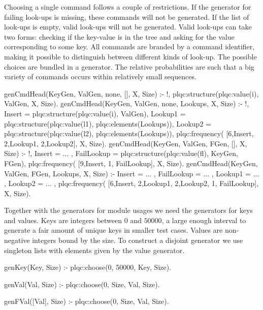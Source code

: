 Choosing a single command follows a couple of restrictions.
%
If the generator for failing look-ups is missing, these commands will
not be generated.
%
If the list of look-ups is empty, valid look-ups will not be generated.
%
Valid look-ups can take two forms: checking if the key-value is in the
tree and asking for the value corresponding to some key.
%
All commands are branded by a command identifier, making it possible to
distinguish between different kinds of look-up.
%
The possible choices are bundled in a  generator.
%
The relative probabilities are such that a big variety of commands occurs within
relatively small sequences.
%
\begin{yapcode}
 genCmdHead(KeyGen, ValGen, none,
           [], X, Size) :- !,
   plqc:structure({plqc:value(i), ValGen},
                  X, Size).
 genCmdHead(KeyGen, ValGen, none,
            Lookups, X, Size) :- !,
   Insert =
     plqc:structure({plqc:value(i),
                     ValGen}),
   Lookup1 =
     plqc:structure({plqc:value(l1),
                     plqc:elements(Lookups)}),
   Lookup2 =
     plqc:structure({plqc:value(l2),
                     plqc:elements(Lookups)}),
   plqc:frequency(
     [{6,Insert}, {2,Lookup1}, {2,Lookup2}],
     X, Size).
 genCmdHead(KeyGen, ValGen, FGen,
            [], X, Size) :- !,
   Insert = ... ,
   FailLookup =
     plqc:structure({plqc:value(fl),
                     {KeyGen, FGen}}),
   plqc:frequency(
     [{9,Insert}, {1, FailLookup}],
     X, Size).
 genCmdHead(KeyGen, ValGen, FGen,
            Lookups, X, Size) :-
   Insert = ... ,
   FailLookup = ... ,
   Lookup1 = ... ,
   Lookup2 = ... ,
   plqc:frequency(
     [{6,Insert}, {2,Lookup1},
       {2,Lookup2}, {1, FailLookup}],
     X, Size).
\end{yapcode}


Together with the generators for module usages we need the generators
for keys and values.
%
Keys are integers between $0$ and $50000$, a large enough interval to
generate a fair amount of unique keys in smaller test cases.
%
Values are non-negative integers bound by the size.
%
To construct a disjoint generator we use singleton lists with elements
given by the value generator.
\begin{yapcode}
 genKey(Key, Size) :-
   plqc:choose(0, 50000, Key, Size).

 genVal(Val, Size) :-
   plqc:choose(0, Size, Val, Size).

 genFVal([Val], Size) :-
   plqc:choose(0, Size, Val, Size).
\end{yapcode}


